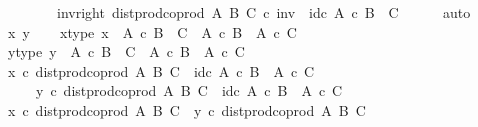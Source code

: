 \begin{isabellebody}
\ \ \ \ \ \ \ \ inv{\isacharunderscore}{\kern0pt}right{\isacharcolon}{\kern0pt}\ {\isachardoublequoteopen}dist{\isacharunderscore}{\kern0pt}prod{\isacharunderscore}{\kern0pt}coprod\ A\ B\ C\ {\isasymcirc}\isactrlsub c\ inv\ {\isacharequal}{\kern0pt}\ id\isactrlsub c\ {\isacharparenleft}{\kern0pt}A\ {\isasymtimes}\isactrlsub c\ B\ {\isasymCoprod}\ C{\isacharparenright}{\kern0pt}{\isachardoublequoteclose}\isanewline
\ \ \ \ \isamarkupfalse%
\ auto\isanewline
\isanewline
\ \ \isamarkupfalse%
\ x\ y\isanewline
\ \ \isamarkupfalse%
\ x{\isacharunderscore}{\kern0pt}type{\isacharcolon}{\kern0pt}\ {\isachardoublequoteopen}x\ {\isacharcolon}{\kern0pt}\ A\ {\isasymtimes}\isactrlsub c\ B\ {\isasymCoprod}\ C\ {\isasymrightarrow}\ {\isacharparenleft}{\kern0pt}A\ {\isasymtimes}\isactrlsub c\ B{\isacharparenright}{\kern0pt}\ {\isasymCoprod}\ A\ {\isasymtimes}\isactrlsub c\ C{\isachardoublequoteclose}\isanewline
\ \ \isamarkupfalse%
\ y{\isacharunderscore}{\kern0pt}type{\isacharcolon}{\kern0pt}\ {\isachardoublequoteopen}y\ {\isacharcolon}{\kern0pt}\ A\ {\isasymtimes}\isactrlsub c\ B\ {\isasymCoprod}\ C\ {\isasymrightarrow}\ {\isacharparenleft}{\kern0pt}A\ {\isasymtimes}\isactrlsub c\ B{\isacharparenright}{\kern0pt}\ {\isasymCoprod}\ A\ {\isasymtimes}\isactrlsub c\ C{\isachardoublequoteclose}\isanewline
\isanewline
\ \ \isamarkupfalse%
\ {\isachardoublequoteopen}x\ {\isasymcirc}\isactrlsub c\ dist{\isacharunderscore}{\kern0pt}prod{\isacharunderscore}{\kern0pt}coprod\ A\ B\ C\ {\isacharequal}{\kern0pt}\ id\isactrlsub c\ {\isacharparenleft}{\kern0pt}{\isacharparenleft}{\kern0pt}A\ {\isasymtimes}\isactrlsub c\ B{\isacharparenright}{\kern0pt}\ {\isasymCoprod}\ A\ {\isasymtimes}\isactrlsub c\ C{\isacharparenright}{\kern0pt}{\isachardoublequoteclose}\isanewline
\ \ \ \ \ {\isachardoublequoteopen}y\ {\isasymcirc}\isactrlsub c\ dist{\isacharunderscore}{\kern0pt}prod{\isacharunderscore}{\kern0pt}coprod\ A\ B\ C\ {\isacharequal}{\kern0pt}\ id\isactrlsub c\ {\isacharparenleft}{\kern0pt}{\isacharparenleft}{\kern0pt}A\ {\isasymtimes}\isactrlsub c\ B{\isacharparenright}{\kern0pt}\ {\isasymCoprod}\ A\ {\isasymtimes}\isactrlsub c\ C{\isacharparenright}{\kern0pt}{\isachardoublequoteclose}\isanewline
\ \ \isamarkupfalse%
\ \isamarkupfalse%
\ {\isachardoublequoteopen}x\ {\isasymcirc}\isactrlsub c\ dist{\isacharunderscore}{\kern0pt}prod{\isacharunderscore}{\kern0pt}coprod\ A\ B\ C\ {\isacharequal}{\kern0pt}\ y\ {\isasymcirc}\isactrlsub c\ dist{\isacharunderscore}{\kern0pt}prod{\isacharunderscore}{\kern0pt}coprod\ A\ B\ C{\isachardoublequoteclose}\isanewline

\end{isabellebody}
